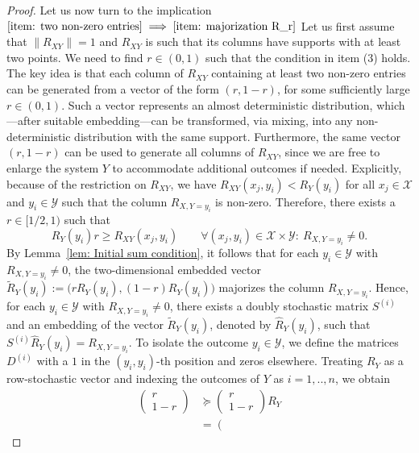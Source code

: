 \documentclass[aps,pra,11pt,onecolumn,nofootinbib,tightenlines]{revtex4-2}
\theoremstyle{definition}
\begin{document}
\begin{proof}
\bigskip
Let us now turn to the implication $\ref{item: two non-zero entries} \implies \ref{item: majorization R_r}$
Let us first assume that $\|R_{XY}\|=1$ and $R_{XY}$ is such that its columns have supports with at least two points. We need to find $r\in(0,1)$ such that the condition in item (3) holds.
The key idea is that each column of \( R_{XY} \) containing at least two non-zero entries can be generated from a vector of the form \( (r, 1 - r) \), for some sufficiently large \( r \in (0,1) \). Such a vector represents an almost deterministic distribution, which—after suitable embedding—can be transformed, via mixing, into any non-deterministic distribution with the same support. Furthermore, the same vector \( (r, 1 - r) \) can be used to generate all columns of \( R_{XY} \), since we are free to enlarge the system \( Y \) to accommodate additional outcomes if needed. Explicitly,
because of the restriction on $R_{XY}$, we have $R_{XY}(x_j,y_i)<R_Y(y_i)$ for all $x_j\in \mathcal{X}$ and $y_i\in \mathcal{Y}$ such that the column $R_{X,Y=y_i}$ is non-zero. Therefore, there exists a $r\in[1/2,1)$ such that
\begin{equation}
R_Y(y_i)r\geq R_{XY}(x_j,y_i)\qquad\forall(x_j,y_i)\in \mathcal{X}\times \mathcal{Y}:\ R_{X,Y=y_i}\neq0.
\end{equation}
By Lemma~\ref{lem: Initial sum condition}, it follows that for each \( y_i \in \mathcal{Y} \) with \( R_{X,Y=y_i} \neq 0 \), the two-dimensional embedded vector $\widetilde{R}_Y(y_i) := \big(r R_Y(y_i), (1 - r) R_Y(y_i)\big)$
majorizes the column \( R_{X,Y=y_i} \).
Hence, for each \( y_i \in \mathcal{Y} \) with \( R_{X,Y=y_i} \neq 0 \), there exists a doubly stochastic matrix \( S^{(i)} \) and an embedding of the vector \( \widetilde{R}_Y(y_i) \), denoted by \( \widehat{R}_Y(y_i) \), such that $S^{(i)} \widehat{R}_Y(y_i) = R_{X,Y=y_i}$.
To isolate the outcome \( y_i \in \mathcal{Y} \), we define the matrices \( D^{(i)} \) with a $1$ in the \( (y_i, y_i) \)-th position and zeros elsewhere. Treating \( R_Y \) as a row-stochastic vector and indexing the outcomes of $Y$ as \( i = 1,..,n \), we obtain
\begin{align}
\left(\begin{array}{c}
r\\1-r
\end{array}\right)&\succeq\left(\begin{array}{c}
r\\1-r
\end{array}\right)R_Y\\
&=\left(\begin{array}{ccc}

\end{array}
\end{align}
\end{proof}
\end{document}
